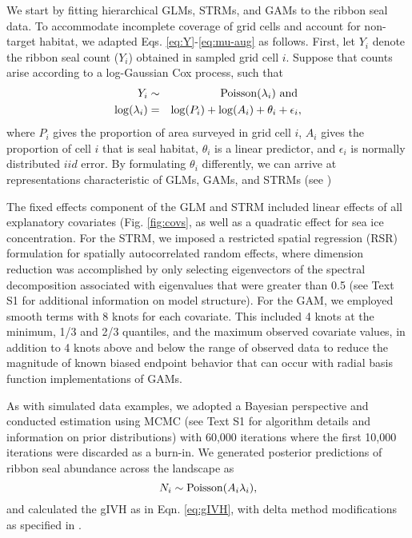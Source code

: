 \documentclass[10pt,letterpaper]{article}
\begin{document}
We start by fitting hierarchical GLMs, STRMs, and GAMs to the ribbon seal data.  To accommodate incomplete coverage of grid cells and account for non-target habitat, we adapted Eqs. \ref{eq:Y}-\ref{eq:mu-aug} as follows.
First, let $Y_i$ denote the ribbon seal count ($Y_i$) obtained in sampled grid cell $i$.  Suppose that counts arise according to a log-Gaussian Cox process, such that
\begin{eqnarray}
  \label{eqn:Cox}
  Y_i & \sim & {\rm Poisson}(\lambda_i) \mbox{ and } \\
  \log(\lambda_i) & = & \log(P_i) + \log(A_i) + \theta_i + \epsilon_i, \nonumber
\end{eqnarray}
where $P_i$ gives the proportion of area surveyed in grid cell $i$, $A_i$ gives the proportion of cell $i$ that is seal habitat, $\theta_i$ is a linear predictor, and $\epsilon_i$ is normally distributed $iid$ error.  By formulating $\theta_i$ differently, we can arrive at representations characteristic of GLMs, GAMs, and STRMs (see )

The fixed effects component of the GLM and STRM included linear effects of all explanatory covariates (Fig. \ref{fig:covs}, as well as a quadratic effect for sea ice concentration.  For the STRM, we imposed a restricted spatial regression (RSR) formulation for spatially autocorrelated random effects, where dimension reduction was accomplished by only selecting eigenvectors of the spectral decomposition associated with eigenvalues that were greater than 0.5 (see Text S1 for additional information on model structure).  For the GAM, we employed smooth terms with 8 knots for each covariate.  This included 4 knots at the minimum, 1/3 and 2/3 quantiles, and the maximum observed covariate values, in addition to 4 knots above and below the range of observed data to reduce the magnitude of known biased endpoint behavior that can occur with radial basis function implementations of GAMs.

As with simulated data examples, we adopted a Bayesian perspective and conducted estimation using MCMC (see Text S1 for algorithm details and information on prior distributions) with 60,000 iterations where the first 10,000 iterations were discarded as a burn-in.  We generated posterior predictions of ribbon seal abundance across the landscape as
\begin{equation}
  N_i \sim {\rm Poisson}(A_i \lambda_i),
\end{equation}
and calculated the gIVH as in Eqn. \ref{eq:gIVH}, with delta method modifications as specified in .
\end{document}
